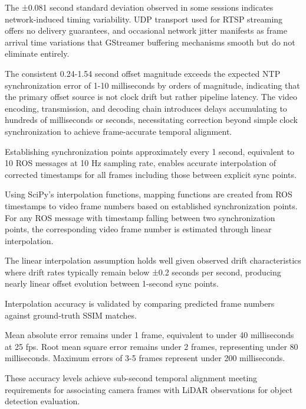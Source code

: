 \documentclass{erauthesis}
\begin{document}

The ±0.081 second standard deviation observed in some sessions indicates network-induced timing variability.
UDP transport used for RTSP streaming offers no delivery guarantees, and occasional network jitter manifests as frame arrival time variations that GStreamer buffering mechanisms smooth but do not eliminate entirely.


The consistent 0.24-1.54 second offset magnitude exceeds the expected NTP synchronization error of 1-10 milliseconds by orders of magnitude, indicating that the primary offset source is not clock drift but rather pipeline latency.
The video encoding, transmission, and decoding chain introduces delays accumulating to hundreds of milliseconds or seconds, necessitating correction beyond simple clock synchronization to achieve frame-accurate temporal alignment.


Establishing synchronization points approximately every 1 second, equivalent to 10 ROS messages at 10 Hz sampling rate, enables accurate interpolation of corrected timestamps for all frames including those between explicit sync points.


Using SciPy's interpolation functions, mapping functions are created from ROS timestamps to video frame numbers based on established synchronization points.
For any ROS message with timestamp falling between two synchronization points, the corresponding video frame number is estimated through linear interpolation.

The linear interpolation assumption holds well given observed drift characteristics where drift rates typically remain below ±0.2 seconds per second, producing nearly linear offset evolution between 1-second sync points.


Interpolation accuracy is validated by comparing predicted frame numbers against ground-truth SSIM matches.

Mean absolute error remains under 1 frame, equivalent to under 40 milliseconds at 25 fps.
Root mean square error remains under 2 frames, representing under 80 milliseconds.
Maximum errors of 3-5 frames represent under 200 milliseconds.

These accuracy levels achieve sub-second temporal alignment meeting requirements for associating camera frames with LiDAR observations for object detection evaluation.
\end{document}

